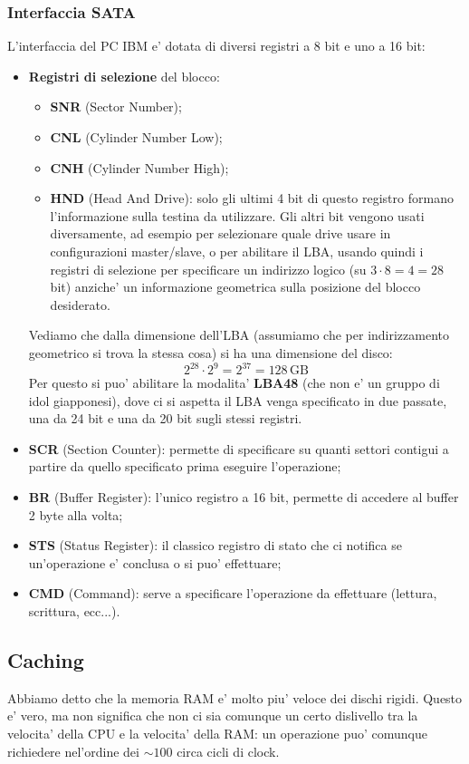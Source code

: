 \documentclass[a4paper,11pt]{article}
\begin{document}
\subsubsection{Interfaccia SATA}
L'interfaccia del PC IBM e' dotata di diversi registri a 8 bit e uno a 16 bit:
\begin{itemize}
	\item \textbf{Registri di selezione} del blocco:
		\begin{itemize}
			\item \textbf{SNR} (Sector Number);
			\item \textbf{CNL} (Cylinder Number Low);
			\item \textbf{CNH} (Cylinder Number High);
			\item \textbf{HND} (Head And Drive): solo gli ultimi 4 bit di questo registro formano l'informazione sulla testina da utilizzare.
				Gli altri bit vengono usati diversamente, ad esempio per selezionare quale drive usare in configurazioni master/slave, o per abilitare il LBA, usando quindi i registri di selezione per specificare un indirizzo logico (su $3 \cdot 8 = 4 = 28$ bit) anziche' un informazione geometrica sulla posizione del blocco desiderato.
		\end{itemize}

		Vediamo che dalla dimensione dell'LBA (assumiamo che per indirizzamento geometrico si trova la stessa cosa) si ha una dimensione del disco:
		$$
		2^{28} \cdot 2^9 = 2^{37} = 128 \, \mathrm{GB}
		$$
		Per questo si puo' abilitare la modalita' \textbf{LBA48} (che non e' un gruppo di idol giapponesi), dove ci si aspetta il LBA venga specificato in due passate, una da 24 bit e una da 20 bit sugli stessi registri.
	\item \textbf{SCR} (Section Counter): permette di specificare su quanti settori contigui a partire da quello specificato prima eseguire l'operazione;
	\item \textbf{BR} (Buffer Register): l'unico registro a 16 bit, permette di accedere al buffer 2 byte alla volta;
	\item \textbf{STS} (Status Register): il classico registro di stato che ci notifica se un'operazione e' conclusa o si puo' effettuare;
	\item \textbf{CMD} (Command): serve a specificare l'operazione da effettuare (lettura, scrittura, ecc...).
\end{itemize}

\subsection{Caching}
Abbiamo detto che la memoria RAM e' molto piu' veloce dei dischi rigidi.
Questo e' vero, ma non significa che non ci sia comunque un certo dislivello tra la velocita' della CPU e la velocita' della RAM: un operazione puo' comunque richiedere nel'ordine dei $\sim 100$ circa cicli di clock.
\end{document}
